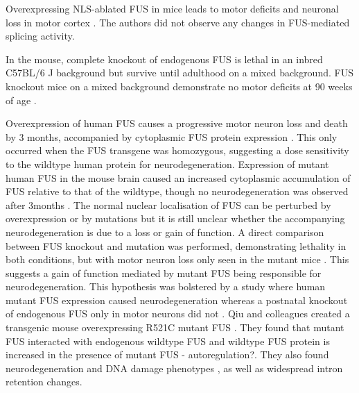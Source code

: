 Overexpressing NLS-ablated FUS in mice leads to motor deficits and neuronal loss in motor cortex \citep{Shiihashi2016}. The authors did not observe any changes in FUS-mediated splicing activity.


In the mouse, complete knockout of endogenous FUS is lethal in an inbred C57BL/6 J background  \citep{Hicks2000, Kuroda2000} but survive until adulthood on a mixed background. 
FUS knockout mice on a mixed background demonstrate no motor deficits at 90 weeks of age \citep{Kino2015}.

Overexpression of human FUS causes a progressive motor neuron loss and death by 3 months, accompanied by cytoplasmic FUS protein expression \citep{Mitchell2013}. 
This only occurred when the FUS transgene was homozygous, suggesting a dose sensitivity to the wildtype human protein for neurodegeneration. Expression of mutant human FUS in the mouse brain caused an increased cytoplasmic accumulation of FUS relative to that of the wildtype, though no neurodegeneration was observed after 3months \citep{Verbeeck2012}. 
The normal nuclear localisation of FUS can be perturbed by overexpression or by mutations but it is still unclear whether the accompanying neurodegeneration is due to a loss or gain of function. A direct comparison between FUS knockout and mutation was performed, demonstrating lethality in both conditions, but with motor neuron loss only seen in the mutant mice \citep{Scekic-zahirovic2016}. This suggests a gain of function mediated by mutant FUS being responsible for neurodegeneration. This hypothesis was bolstered by a study where human mutant FUS expression caused neurodegeneration whereas a postnatal knockout of endogenous FUS only in motor neurons did not \citep{Sharma2016}. 
Qiu and colleagues created a transgenic mouse overexpressing R521C mutant FUS \cite{Qiu2014}. They found that mutant FUS interacted with endogenous wildtype FUS and wildtype FUS protein is increased in the presence of mutant FUS - autoregulation?. They also found neurodegeneration and DNA damage phenotypes , as well as widespread intron retention changes. 





